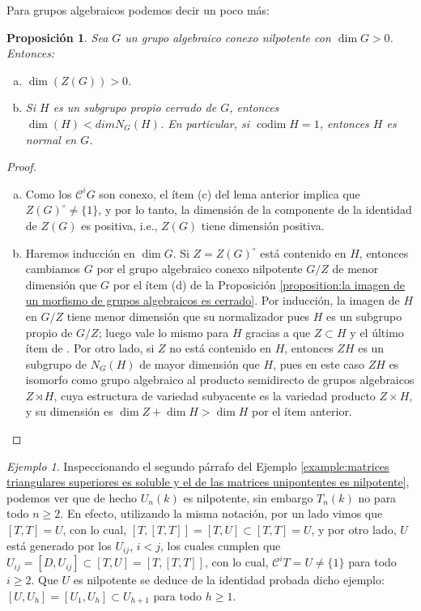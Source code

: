 \documentclass[spanish,10pt]{amsart}
\newtheorem{proposition}[theorem]{Proposición}
\theoremstyle{definition}
\theoremstyle{remark}
\newtheorem{example}[theorem]{Ejemplo}
\numberwithin{equation}{section}
\begin{document}
Para grupos algebraicos podemos decir un poco más:
\begin{proposition}
Sea $G$ un grupo algebraico conexo nilpotente con $\dim G > 0$. Entonces:
\begin{enumerate}[(a)]
\item $\dim (Z(G)) > 0$.
\item Si $H$ es un subgrupo propio cerrado de $G$, entonces $\dim (H) < dim N_G (H)$. En particular, si $\operatorname{codim} H = 1$, entonces $H$ es normal en $G$.
\end{enumerate}
\end{proposition}
\begin{proof}
\begin{enumerate}[(a)]
\item Como los $\mathcal C^i G$ son conexo, el ítem (c) del lema anterior implica que $Z(G)^\circ \neq \{1\}$, y por lo tanto, la dimensión de la componente de la identidad de $Z(G)$ es positiva, i.e., $Z(G)$ tiene dimensión positiva.
\item Haremos inducción en $\dim G$. Si $Z = Z(G)^\circ$ está contenido en $H$, entonces cambiamos $G$ por el grupo algebraico conexo nilpotente $G/Z$ de menor dimensión que $G$ por el ítem (d) de la Proposición \ref{proposition:la imagen de un morfismo de grupos algebraicos es cerrado}. Por inducción, la imagen de $H$ en $G/Z$ tiene menor dimensión que su normalizador pues $H$ es un subgrupo propio de $G/Z$; luego vale lo mismo para $H$ gracias a que $Z \subset H$ y el último ítem de . Por otro lado, si $Z$ no está contenido en $H$, entonces $ZH$ es un subgrupo de $N_G (H)$ de mayor dimensión que $H$, pues en este caso $ZH$ es isomorfo como grupo algebraico al producto semidirecto de grupos algebraicos $Z \rtimes H$, cuya estructura de variedad subyacente es la variedad producto $Z \times H$, y su dimensión es $\dim Z + \dim H > \dim H$ por el ítem anterior.
\end{enumerate}
\end{proof}

\begin{example}
Inspeccionando el segundo párrafo del Ejemplo \ref{example:matrices triangulares superiores es soluble y el de las matrices unipontentes es nilpotente}, podemos ver que de hecho $U_n (k)$ es nilpotente, sin embargo $T_n (k)$ no para todo $n \geq 2$. En efecto, utilizando la misma notación, por un lado vimos que $[T,T] = U$, con lo cual, $[T,[T,T]] = [T,U] \subset [T,T] = U$, y por otro lado, $U$ está generado por los $U_{ij}$, $i< j$, los cuales cumplen que $U_{ij} = [D, U_{ij}] \subset [T,U] = [T,[T,T]]$, con lo cual, $\mathcal C^i T = U \neq \{1\}$ para todo $i \geq 2$. Que $U$ es nilpotente se deduce de la identidad probada dicho ejemplo: $[U, U_h] = [U_1, U_h] \subset U_{h+1}$ para todo $h \geq 1$.
\end{example}
\end{document}
